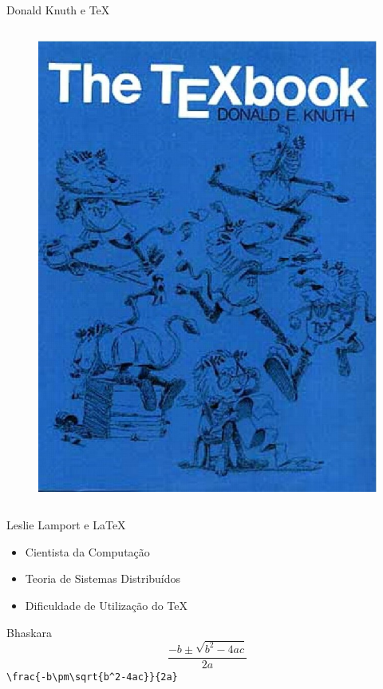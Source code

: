 \documentclass[hyperref={pdfpagelabels=false}]{beamer}
\begin{document}
\begin{frame}{Donald Knuth e \TeX{}}
\begin{columns}[c]
\begin{column}{0.5\textwidth}
\begin{figure}
                \includegraphics[width=\textwidth]{images/texbook}
            \end{figure}
        \end{column}
    \end{columns}
\end{frame}

\begin{frame}[fragile]{Leslie Lamport e \LaTeX{}}
    \begin{itemize}
        \item Cientista da Computação
        \item Teoria de Sistemas Distribuídos
        \item Dificuldade de Utilização do \TeX{}
    \end{itemize}
    \pause{}
    \begin{block}{Bhaskara}
        \begin{equation*}
            \frac{-b\pm\sqrt{b^2-4ac}}{2a}
        \end{equation*}
        \centering{}
        \verb,\frac{-b\pm\sqrt{b^2-4ac}}{2a},
    \end{block}
\end{frame}
\end{document}
